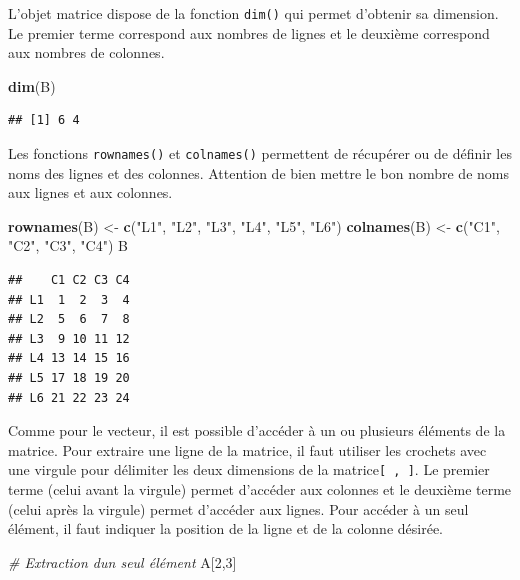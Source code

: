 \documentclass[
]{book}
\newenvironment{Shaded}{\begin{snugshade}}{\end{snugshade}}
\newcommand{\CommentTok}[1]{\textcolor[rgb]{0.56,0.35,0.01}{\textit{#1}}}
\newcommand{\DecValTok}[1]{\textcolor[rgb]{0.00,0.00,0.81}{#1}}
\newcommand{\FunctionTok}[1]{\textcolor[rgb]{0.13,0.29,0.53}{\textbf{#1}}}
\newcommand{\NormalTok}[1]{#1}
\newcommand{\OtherTok}[1]{\textcolor[rgb]{0.56,0.35,0.01}{#1}}
\newcommand{\StringTok}[1]{\textcolor[rgb]{0.31,0.60,0.02}{#1}}
\begin{document}
L'objet matrice dispose de la fonction \texttt{dim()} qui permet d'obtenir sa dimension. Le premier terme correspond aux nombres de lignes et le deuxième correspond aux nombres de colonnes.

\begin{Shaded}
\begin{Highlighting}[]
\FunctionTok{dim}\NormalTok{(B)}
\end{Highlighting}
\end{Shaded}

\begin{verbatim}
## [1] 6 4
\end{verbatim}

Les fonctions \texttt{rownames()} et \texttt{colnames()} permettent de récupérer ou de définir les noms des lignes et des colonnes. Attention de bien mettre le bon nombre de noms aux lignes et aux colonnes.

\begin{Shaded}
\begin{Highlighting}[]
\FunctionTok{rownames}\NormalTok{(B) }\OtherTok{\textless{}{-}} \FunctionTok{c}\NormalTok{(}\StringTok{"L1"}\NormalTok{, }\StringTok{"L2"}\NormalTok{, }\StringTok{"L3"}\NormalTok{, }\StringTok{"L4"}\NormalTok{, }\StringTok{"L5"}\NormalTok{, }\StringTok{"L6"}\NormalTok{)}
\FunctionTok{colnames}\NormalTok{(B) }\OtherTok{\textless{}{-}} \FunctionTok{c}\NormalTok{(}\StringTok{"C1"}\NormalTok{, }\StringTok{"C2"}\NormalTok{, }\StringTok{"C3"}\NormalTok{, }\StringTok{"C4"}\NormalTok{)}
\NormalTok{B}
\end{Highlighting}
\end{Shaded}

\begin{verbatim}
##    C1 C2 C3 C4
## L1  1  2  3  4
## L2  5  6  7  8
## L3  9 10 11 12
## L4 13 14 15 16
## L5 17 18 19 20
## L6 21 22 23 24
\end{verbatim}

Comme pour le vecteur, il est possible d'accéder à un ou plusieurs éléments de la matrice.
Pour extraire une ligne de la matrice, il faut utiliser les crochets avec une virgule pour délimiter les deux dimensions de la matrice\texttt{{[}\ ,\ {]}}. Le premier terme (celui avant la virgule) permet d'accéder aux colonnes et le deuxième terme (celui après la virgule) permet d'accéder aux lignes.
Pour accéder à un seul élément, il faut indiquer la position de la ligne et de la colonne désirée.

\begin{Shaded}
\begin{Highlighting}[]
\CommentTok{\# Extraction d\textquotesingle{}un seul élément}
\NormalTok{A[}\DecValTok{2}\NormalTok{,}\DecValTok{3}\NormalTok{]}
\end{Highlighting}
\end{Shaded}
\end{document}
